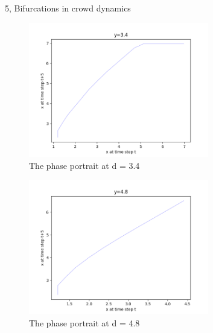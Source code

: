 \documentclass[10pt,a4paper]{article}
\begin{document}
\begin{task}{5, Bifurcations in crowd dynamics}
\begin{figure}[H]
    \centering
    \includegraphics[width=0.7\textwidth]{../plots/task5/0_phase_portrait_y_3_4_second_part.png}
    \caption{The phase portrait at d = 3.4}
    \label{fig:part2_bifurcation}
\end{figure}

\begin{figure}[H]
    \centering
    \includegraphics[width=0.7\textwidth]{../plots/task5/0_phase_portrait_y_4_8_second_part.png}
    \caption{The phase portrait at d = 4.8}
    \label{fig:part2_bifurcation}
\end{figure}
\end{task}
\end{document}
